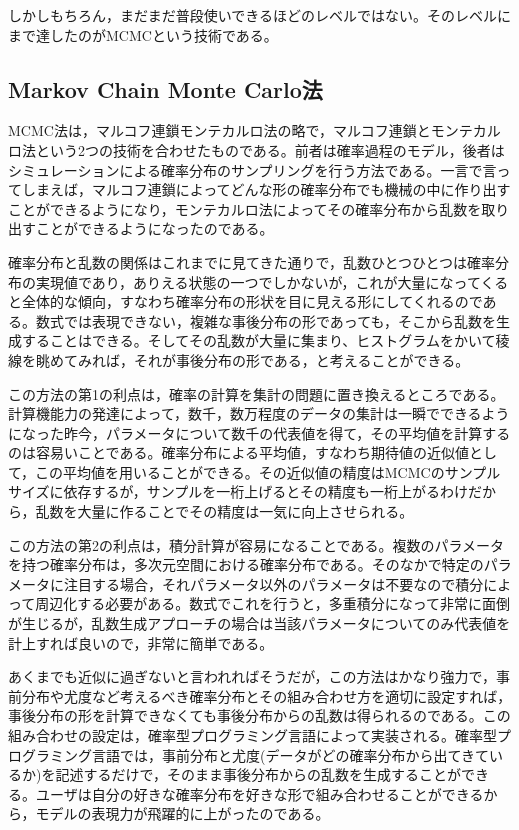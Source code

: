 \documentclass[
  a4paper,
]{ltjsbook}
\begin{document}
しかしもちろん，まだまだ普段使いできるほどのレベルではない。そのレベルにまで達したのがMCMCという技術である。

\subsection{Markov Chain Monte
Carlo法}\label{markov-chain-monte-carloux6cd5}

MCMC法は，マルコフ連鎖モンテカルロ法の略で，マルコフ連鎖とモンテカルロ法という2つの技術を合わせたものである。前者は確率過程のモデル，後者はシミュレーションによる確率分布のサンプリングを行う方法である。一言で言ってしまえば，マルコフ連鎖によってどんな形の確率分布でも機械の中に作り出すことができるようになり，モンテカルロ法によってその確率分布から乱数を取り出すことができるようになったのである。

確率分布と乱数の関係はこれまでに見てきた通りで，乱数ひとつひとつは確率分布の実現値であり，ありえる状態の一つでしかないが，これが大量になってくると全体的な傾向，すなわち確率分布の形状を目に見える形にしてくれるのである。数式では表現できない，複雑な事後分布の形であっても，そこから乱数を生成することはできる。そしてその乱数が大量に集まり、ヒストグラムをかいて稜線を眺めてみれば，それが事後分布の形である，と考えることができる。

この方法の第1の利点は，確率の計算を集計の問題に置き換えるところである。計算機能力の発達によって，数千，数万程度のデータの集計は一瞬でできるようになった昨今，パラメータについて数千の代表値を得て，その平均値を計算するのは容易いことである。確率分布による平均値，すなわち期待値の近似値として，この平均値を用いることができる。その近似値の精度はMCMCのサンプルサイズに依存するが，サンプルを一桁上げるとその精度も一桁上がるわけだから，乱数を大量に作ることでその精度は一気に向上させられる。

この方法の第2の利点は，積分計算が容易になることである。複数のパラメータを持つ確率分布は，多次元空間における確率分布である。そのなかで特定のパラメータに注目する場合，それパラメータ以外のパラメータは不要なので積分によって周辺化する必要がある。数式でこれを行うと，多重積分になって非常に面倒が生じるが，乱数生成アプローチの場合は当該パラメータについてのみ代表値を計上すれば良いので，非常に簡単である。

あくまでも近似に過ぎないと言われればそうだが，この方法はかなり強力で，事前分布や尤度など考えるべき確率分布とその組み合わせ方を適切に設定すれば，事後分布の形を計算できなくても事後分布からの乱数は得られるのである。この組み合わせの設定は，確率型プログラミング言語によって実装される。確率型プログラミング言語では，事前分布と尤度(データがどの確率分布から出てきているか)を記述するだけで，そのまま事後分布からの乱数を生成することができる。ユーザは自分の好きな確率分布を好きな形で組み合わせることができるから，モデルの表現力が飛躍的に上がったのである。
\end{document}
